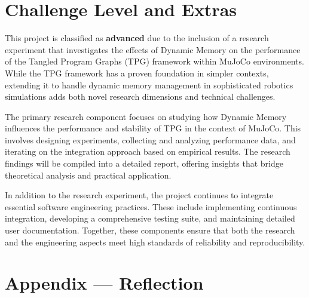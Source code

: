 \documentclass{article}
\begin{document}
\section{Challenge Level and Extras}

This project is classified as \textbf{advanced} due to the inclusion of a research experiment that investigates the effects of Dynamic Memory on the performance of the Tangled Program Graphs (TPG) framework within MuJoCo environments. While the TPG framework has a proven foundation in simpler contexts, extending it to handle dynamic memory management in sophisticated robotics simulations adds both novel research dimensions and technical challenges.

The primary research component focuses on studying how Dynamic Memory influences the performance and stability of TPG in the context of MuJoCo. This involves designing experiments, collecting and analyzing performance data, and iterating on the integration approach based on empirical results. The research findings will be compiled into a detailed report, offering insights that bridge theoretical analysis and practical application.

In addition to the research experiment, the project continues to integrate essential software engineering practices. These include implementing continuous integration, developing a comprehensive testing suite, and maintaining detailed user documentation. Together, these components ensure that both the research and the engineering aspects meet high standards of reliability and reproducibility.

\newpage{}

\section*{Appendix --- Reflection}


\end{document}
